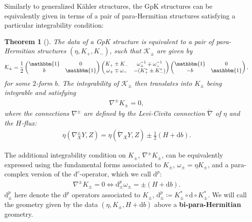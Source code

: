 \documentclass{article}
\newcommand{\KK}{\mathcal{K}}
\newcommand{\id}{\mathbbm{1}}
\newcommand{\lc}{\mathring{\n}}
\newcommand{\n}{\nabla}
\newcommand{\rd}{\mathrm{d}}
\newtheorem{theorem}{Theorem}[section]
\theoremstyle{definition}
\theoremstyle{remark}
\begin{document}
Similarly to generalized K\"ahler structures, the GpK structures can be equivalently given in terms of a pair of para-Hermitian structures satisfying a particular integrability condition:
\begin{theorem}[\cite{Hu:2019zro}]
The data of a GpK structure is equivalent to a pair of para-Hermitian structures $(\eta,K_+,K_-)$, such that $\KK_\pm$ are given by
\begin{align}\label{eq:GpK_genform}
\KK_{\pm}=\frac{1}{2}
\begin{pmatrix}
\id & 0 \\
b & \id
\end{pmatrix}
\begin{pmatrix}
K_+\pm K_- & \omega^{-1}_+\mp \omega^{-1}_- \\
\omega_+\mp \omega_- & -(K_+^*\pm K_-^*)
\end{pmatrix}
\begin{pmatrix}
\id & 0 \\
-b & \id
\end{pmatrix},
\end{align}
for some $2$-form $b$. The integrability of $\KK_\pm$ then translates into $K_\pm$ being integrable and satisfying
\begin{align*}
\n^\pm K_\pm=0,
\end{align*}
where the connections $\n^\pm$ are defined by the Levi-Civita connection $\lc$ of $\eta$ and the $H$-flux:
\begin{align*}
\eta(\n^\pm_XY,Z)=\eta(\lc_XY,Z)\pm\frac{1}{2}(H+\rd b).
\end{align*}
\end{theorem}

The additional integrability condition on $K_\pm$, $\n^\pm K_\pm$, can be equivalently expressed using the fundamental forms associated to $K_\pm$, $\omega_\pm=\eta K_\pm$, and a para-complex version of the $\rd^c$-operator, which we call $\rd^p$:
\begin{align*}
\n^\pm K_\pm=0 \Longleftrightarrow \rd^p_\pm\omega_\pm=\pm (H+\rd b).
\end{align*}
$\rd^p_\pm$ here denote the $\rd^p$ operators associated to $K_\pm$, $\rd^p_\pm\coloneqq K_\pm^*\circ \rd\circ K_\pm^*$. We will call the geometry given by the data $(\eta, K_\pm, H+\rd b)$ above a {\bf bi-para-Hermitian} geometry.
\end{document}

